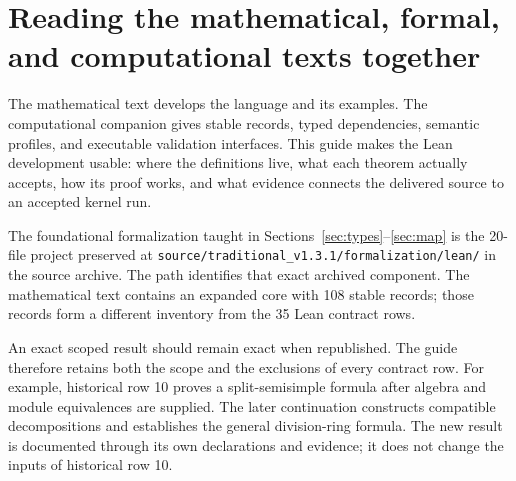 \documentclass[11pt,a4paper]{article}
\newcommand{\code}[1]{\nolinkurl{#1}}
\begin{document}
\KomorebiCover
{}

\tableofcontents
\clearpage

\section{Reading the mathematical, formal, and computational texts together}

The mathematical text develops the language and its examples. The computational companion gives stable records, typed dependencies, semantic profiles, and executable validation interfaces. This guide makes the Lean development usable: where the definitions live, what each theorem actually accepts, how its proof works, and what evidence connects the delivered source to an accepted kernel run.

The foundational formalization taught in Sections~\ref{sec:types}--\ref{sec:map} is the 20-file project preserved at \code{source/traditional_v1.3.1/formalization/lean/} in the source archive. The path identifies that exact archived component. The mathematical text contains an expanded core with 108 stable records; those records form a different inventory from the 35 Lean contract rows.

An exact scoped result should remain exact when republished. The guide therefore retains both the scope and the exclusions of every contract row. For example, historical row 10 proves a split-semisimple formula after algebra and module equivalences are supplied. The later continuation constructs compatible decompositions and establishes the general division-ring formula. The new result is documented through its own declarations and evidence; it does not change the inputs of historical row 10.
\end{document}
